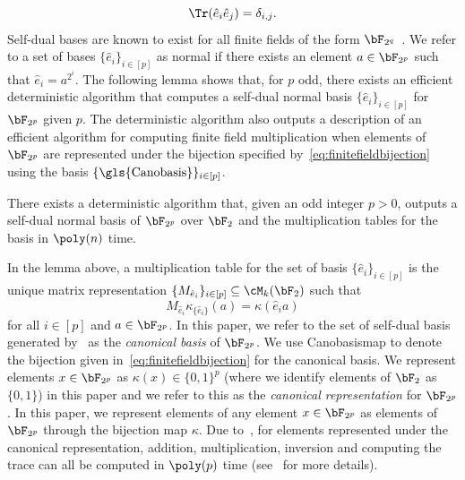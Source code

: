 \begin{equation*}
	\Tr(\hat{e}_i \hat{e}_j) = \delta_{i,j}. 
\end{equation*}
Self-dual bases are known to exist for all finite fields of the form $\bF_{2^q}$~\cite[Theorem 1.9]{blakeApplicationsFiniteFields1993}. We refer to a set of bases $\{\hat{e}_i\}_{i \in [p]}$ as normal if there exists an element $a \in \bF_{2^{p}}$ such that $\hat{e}_i = a^{2^i}$. The following lemma shows that, for $p$ odd, there exists an efficient deterministic algorithm that computes a self-dual normal basis $\{\hat{e}_i\}_{i \in [p]}$ for $\bF_{2^p}$ given $p$. The deterministic algorithm also outputs a description of an efficient algorithm for computing finite field multiplication when elements of  $\bF_{2^p}$ are represented under the bijection specified by~\eqref{eq:finitefieldbijection} using the basis $\{\text{\gls{Canobasis}}\}_{i \in [p]}$.
\begin{lemma} \label{lem:compfinitefield}
	There exists a deterministic algorithm that, given an odd integer $p >0$, outputs a self-dual normal basis of $\bF_{2^p}$ over $\bF_2$ and the multiplication tables for the basis in $\poly(n)$ time.  
\end{lemma}
In the lemma above, a multiplication table for the set of basis $\{ \hat{e}_i\}_{i \in [p]}$ is the unique matrix representation $\{M_{\hat{e}_i}\}_{i \in [p]} \subseteq \cM_{k}(\bF_2)$ such that 
\begin{equation*}
	M_{\hat{e}_i} \kappa_{\{ \hat{e}_i\}}(a) = \kappa(\hat{e}_i a) 
\end{equation*}
for all $i \in [p]$ and $a \in \bF_{2^p}$. In this paper, we refer to the set of self-dual basis generated by~ as the \textit{canonical basis} of $\bF_{2^p}$. We use \gls{Canobasismap} to denote the bijection given in~\eqref{eq:finitefieldbijection} for the canonical basis. We represent elements $x \in \bF_{2^p}$ as $\kappa(x) \in \{0,1\}^p$ (where we identify elements of $\bF_2$ as $\{0,1\}$) in this paper and we refer to this as the \textit{canonical representation} for $\bF_{2^p}$. In this paper, we represent elements of any element $x \in \bF_{2^p}$ as elements of $\bF_{2^p}$ through the bijection map $\kappa$. Due to~, for elements represented under the canonical representation, addition, multiplication, inversion and computing the trace can all be computed in $\poly(p)$ time (see~\cite[Lemma 3.18]{jiMIPRE2022a} for more details). 

